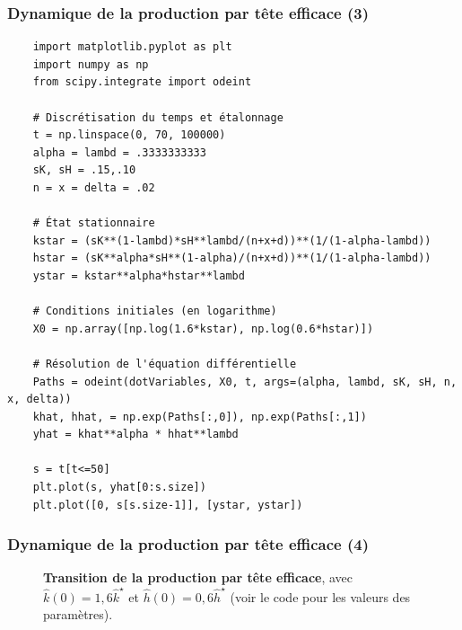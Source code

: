 \documentclass[10pt,notheorems]{beamer}
\theoremstyle{plain}
\theoremstyle{definition} %
\begin{document}
\begin{frame}[fragile]
  \frametitle{Dynamique de la production par tête efficace (3)}


  \begin{verbatim}
    import matplotlib.pyplot as plt
    import numpy as np
    from scipy.integrate import odeint

    # Discrétisation du temps et étalonnage
    t = np.linspace(0, 70, 100000)
    alpha = lambd = .3333333333
    sK, sH = .15,.10
    n = x = delta = .02

    # État stationnaire
    kstar = (sK**(1-lambd)*sH**lambd/(n+x+d))**(1/(1-alpha-lambd))
    hstar = (sK**alpha*sH**(1-alpha)/(n+x+d))**(1/(1-alpha-lambd))
    ystar = kstar**alpha*hstar**lambd

    # Conditions initiales (en logarithme)
    X0 = np.array([np.log(1.6*kstar), np.log(0.6*hstar)])

    # Résolution de l'équation différentielle
    Paths = odeint(dotVariables, X0, t, args=(alpha, lambd, sK, sH, n, x, delta))
    khat, hhat, = np.exp(Paths[:,0]), np.exp(Paths[:,1])
    yhat = khat**alpha * hhat**lambd

    s = t[t<=50]
    plt.plot(s, yhat[0:s.size])
    plt.plot([0, s[s.size-1]], [ystar, ystar])
  \end{verbatim}

\end{frame}


\begin{frame}[fragile]
  \frametitle{Dynamique de la production par tête efficace (4)}

  \bigskip

  \begin{figure}
    
    \caption{\textbf{Transition de  la production par tête efficace}, avec $\hat k(0)=1,6 \hat k^{\star}$ et $\hat h(0)=0,6 \hat h^{\star}$ (voir le code pour les valeurs des paramètres).}
  \end{figure}

\end{frame}
\end{document}

